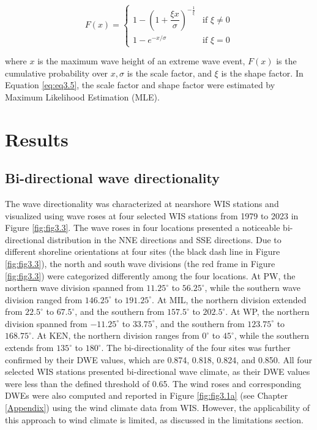 \begin{equation}
    F(x) =
\begin{cases}
1 - \left(1 + \dfrac{\xi x}{\sigma} \right)^{-\frac{1}{\xi}} & \text{if } \xi \ne 0 \\
1 - e^{-x/\sigma} & \text{if } \xi = 0
\end{cases}
\label{eq:eq3.5}
\end{equation}

where $x$ is the maximum wave height of an extreme wave event, $F(x)$ is the
cumulative probability over $x, \sigma$ is the scale factor, and $\xi$ is the
shape factor. In Equation \ref{eq:eq3.5}, the scale factor and shape factor were
estimated by Maximum Likelihood Estimation (MLE). 

\section{Results}
\label{c3_Results}

\subsection{Bi-directional wave directionality}
\label{c3_Bi-directional wave directionality}

The wave directionality was characterized at nearshore WIS stations and
visualized using wave roses at four selected WIS stations from 1979 to 2023 in
Figure \ref{fig:fig3.3}. The wave roses in four locations presented a noticeable
bi-directional distribution in the NNE directions and SSE directions. Due to
different shoreline orientations at four sites (the black dash line in Figure
\ref{fig:fig3.3}), the north and south wave divisions (the red frame in Figure
\ref{fig:fig3.3}) were categorized differently among the four locations. At PW,
the northern wave division spanned from $11.25^\circ$ to $56.25^\circ$, while
the southern wave division ranged from $146.25^\circ$ to $191.25^\circ$. At MIL,
the northern division extended from $22.5^\circ$ to $67.5^\circ$, and the
southern from $157.5^\circ$ to $202.5^\circ$. At WP, the northern division
spanned from $-11.25^\circ$ to $33.75^\circ$, and the southern from
$123.75^\circ$ to $168.75^\circ$. At KEN, the northern division ranges from
$0^\circ$ to $45^\circ$, while the southern extends from $135^\circ$ to
$180^\circ$. The bi-directionality of the four sites was further confirmed by
their DWE values, which are 0.874, 0.818, 0.824, and 0.850. All four selected
WIS stations presented bi-directional wave climate, as their DWE values were
less than the defined threshold of 0.65. The wind roses and corresponding DWEs
were also computed and reported in Figure \ref{fig:fig3.1a} (see Chapter
\ref{Appendix}) using the wind climate data from WIS. However, the applicability
of this approach to wind climate is limited, as discussed in the limitations
section.

